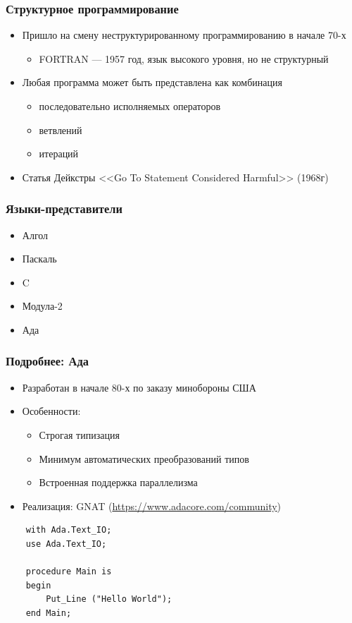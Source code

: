 \documentclass{../../slides-style}
\begin{document}
    \begin{frame}
        \frametitle{Структурное программирование}
        \begin{itemize}
            \item Пришло на смену неструктурированному программированию в начале 70-х
            \begin{itemize}
                \item FORTRAN --- 1957 год, язык высокого уровня, но не структурный
            \end{itemize}
            \item Любая программа может быть представлена как комбинация
            \begin{itemize}
                \item последовательно исполняемых операторов
                \item ветвлений
                \item итераций
            \end{itemize}
            \item Статья Дейкстры <<Go To Statement Considered Harmful>> (1968г)
        \end{itemize}
    \end{frame}

    \begin{frame}
        \frametitle{Языки-представители}
        \begin{itemize}
            \item Алгол
            \item Паскаль
            \item C
            \item Модула-2
            \item Ада
        \end{itemize}
    \end{frame}

    \begin{frame}[fragile]
        \frametitle{Подробнее: Ада}
        \begin{itemize}
            \item Разработан в начале 80-х по заказу минобороны США
            \item Особенности:
            \begin{itemize}
                \item Строгая типизация
                \item Минимум автоматических преобразований типов
                \item Встроенная поддержка параллелизма
            \end{itemize}
            \item Реализация: GNAT (\url{https://www.adacore.com/community})
        \end{itemize}
        \begin{verbatim}
    with Ada.Text_IO;
    use Ada.Text_IO;

    procedure Main is
    begin
        Put_Line ("Hello World");
    end Main;
        \end{verbatim}
    \end{frame}
\end{document}
